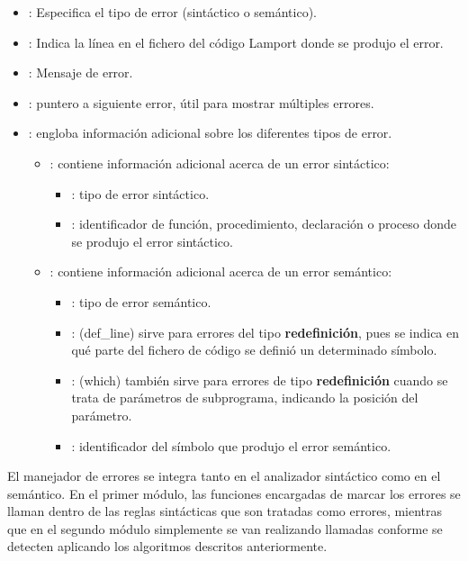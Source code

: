 \begin{itemize}
    \item {}: Especifica el tipo de error (sintáctico o semántico).
    \item {}: Indica la línea en el fichero del código Lamport donde se produjo el error.
    \item {}: Mensaje de error.
    \item {}: puntero a siguiente error, útil para mostrar múltiples errores.
    \item {}: engloba información adicional sobre los diferentes tipos de error.
    \begin{itemize}
        \item {}: contiene información adicional acerca de un error sintáctico:
        \begin{itemize}
            \item {}: tipo de error sintáctico.
            \item {}: identificador de función, procedimiento, declaración o proceso donde se produjo el error sintáctico.
        \end{itemize}
    \end{itemize}
    \begin{itemize}
        \item {}: contiene información adicional acerca de un error semántico:
        \begin{itemize}
            \item {}: tipo de error semántico.
            \item {}: (def\_line) sirve para errores del tipo \textbf{redefinición}, pues se indica en qué parte del fichero de código se definió un determinado símbolo.
            \item {}: (which) también sirve para errores de tipo \textbf{redefinición} cuando se trata de parámetros de subprograma, indicando la posición del parámetro.
            \item {}: identificador del símbolo que produjo el error semántico.
        \end{itemize}
    \end{itemize}
\end{itemize}


El manejador de errores se integra tanto en el analizador sintáctico como en el semántico. En el primer módulo, las funciones encargadas de marcar los errores se llaman dentro de las reglas sintácticas que son tratadas como errores, mientras que en el segundo módulo simplemente se van realizando llamadas conforme se detecten aplicando los algoritmos descritos anteriormente.


